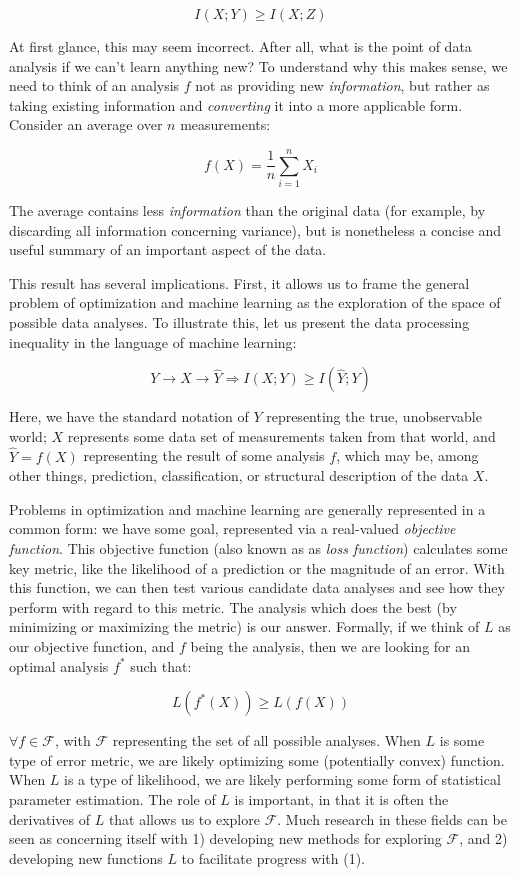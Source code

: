 \[
I(X; Y) \geq I(X; Z)
\]

At first glance, this may seem incorrect.
After all, what is the point of data analysis if we can't learn anything new?
To understand why this makes sense, we need to think of an analysis $f$ not as providing new \textit{information}, but rather as taking existing information and \textit{converting} it into a more applicable form.
Consider an average over $n$ measurements:

\[
f(X) = \frac{1}{n} \sum_{i=1}^n X_i
\]

The average contains less \textit{information} than the original data (for example, by discarding all information concerning variance), but is nonetheless a concise and useful summary of an important aspect of the data.

\bigskip

This result has several implications.
First, it allows us to frame the general problem of optimization and machine learning as the exploration of the space of possible data analyses.
To illustrate this, let us present the data processing inequality in the language of machine learning:

\[
Y \rightarrow X \rightarrow \hat{Y} \Rightarrow I(X; Y) \geq I(\hat{Y}; Y)
\]

Here, we have the standard notation of $Y$ representing the true, unobservable world; $X$ represents some data set of measurements taken from that world, and $\hat{Y} = f(X)$ representing the result of some analysis $f$, which may be, among other things, prediction, classification, or structural description of the data $X$.

Problems in optimization and machine learning are generally represented in a common form: we have some goal, represented via a real-valued \textit{objective function}.
This objective function (also known as as \textit{loss function}) calculates some key metric, like the likelihood of a prediction or the magnitude of an error.
With this function, we can then test various candidate data analyses and see how they perform with regard to this metric.
The analysis which does the best (by minimizing or maximizing the metric) is our answer.
Formally, if we think of $L$ as our objective function, and $f$ being the analysis, then we are looking for an optimal analysis $f^*$ such that:

\[
L(f^*(X)) \geq L(f(X))
\]

$\forall f \in \mathcal{F}$, with $\mathcal{F}$ representing the set of all possible analyses.
When $L$ is some type of error metric, we are likely optimizing some (potentially convex) function.
When $L$ is a type of likelihood, we are likely performing some form of statistical parameter estimation.
The role of $L$ is important, in that it is often the derivatives of $L$ that allows us to explore $\mathcal{F}$.
Much research in these fields can be seen as concerning itself with 1) developing new methods for exploring $\mathcal{F}$, and 2) developing new functions $L$ to facilitate progress with (1).

